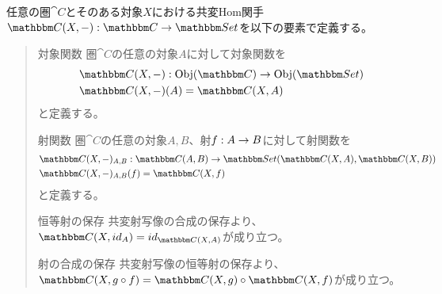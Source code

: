 	\begin{define}[共変Hom関手]\label{def-covariant-hom-functor}
		任意の圏$\cat{C}$とそのある対象$X$における共変Hom関手$\functor{\arset{C}{X}{-}}{C}{Set}$を以下の要素で定義する。
		\begin{quote}
			\begin{mydescription}
				\item[対象関数] 圏$\cat{C}$の任意の対象$A$に対して対象関数を
				\begin{align*}
					&\mor{\arset{C}{X}{-}}{\obj{C}}{\obj{Set}}\\
					&\arset{C}{X}{-}(A)=\arset{C}{X}{A}
				\end{align*}
				と定義する。
				\item[射関数] 圏$\cat{C}$の任意の対象$A,B$、射$f:A\rightarrow B$に対して射関数を
				\begin{align*}
					&\mor{\arset{C}{X}{-}_{A,B}}{\arset{C}{A}{B}}{\arset{Set}{\arset{C}{X}{A}}{\arset{C}{X}{B}}}\\
					&\arset{C}{X}{-}_{A,B}(f)=\arset{C}{X}{f}
				\end{align*}
				と定義する。
				\begin{center}
				\end{center}
				\item[恒等射の保存] 共変射写像の合成の保存より、$\arset{C}{X}{id_A}=id_{\arset{C}{X}{A}}$が成り立つ。
				\item[射の合成の保存] 共変射写像の恒等射の保存より、$\arset{C}{X}{g\circ f}=\arset{C}{X}{g}\circ\arset{C}{X}{f}$が成り立つ。
			\end{mydescription}
		\end{quote}
	\end{define}
	
